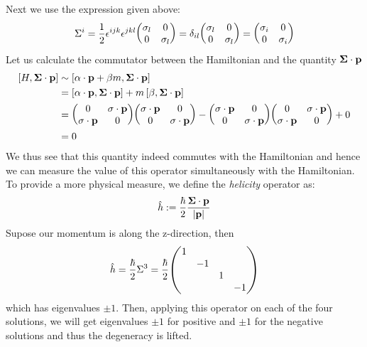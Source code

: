 Next we use the expression given above:
\begin{align*}
    \Sigma^i = \frac{1}{2}\epsilon^{ijk} \epsilon^{jkl}\mqty(\sigma_l & 0\\0 & \sigma_l) = \delta_{il}\mqty(\sigma_l & 0\\0 & \sigma_l) = \mqty(\sigma_i & 0\\0 & \sigma_i)
\end{align*}
Let us calculate the commutator between the Hamiltonian and the quantity $\vb{\Sigma}\cdot \vb{p}$
\begin{align*}
    \comtr{H}{\vb{\Sigma}\cdot \vb{p}} &\sim \comtr{\alpha\cdot\vb{p} + \beta m}{\vb{\Sigma}\cdot \vb{p}}\\
    &=\comtr{\alpha\cdot\vb{p}}{\vb{\Sigma}\cdot \vb{p}} + m\comtr{\beta }{\vb{\Sigma}\cdot \vb{p}}\\
    &=\mqty(0&\vb{\sigma}\cdot \vb{p}\\ \vb{\sigma}\cdot \vb{p}& 0)\mqty(\vb{\sigma}\cdot\vb{p}& 0\\ 0&\vb{\sigma}\cdot\vb{p}) -\mqty(\vb{\sigma}\cdot\vb{p}& 0\\ 0&\vb{\sigma}\cdot\vb{p})\mqty(0&\vb{\sigma}\cdot \vb{p}\\ \vb{\sigma}\cdot \vb{p}& 0) + 0\\
    &=0
\end{align*}
We thus see that this quantity indeed commutes with the Hamiltonian and hence we can measure the value of this operator simultaneously with the Hamiltonian. To provide a more physical measure, we define the \textit{helicity } operator as:
\begin{equation}\label{eqn:helicity}
    \hat{h} :=\frac{\hbar}{2} \frac{\vb{\Sigma}\cdot \vb{p}}{|\vb{p}|}
\end{equation}
Supose our momentum is along the z-direction, then $$\hat{h} = \frac{\hbar}{2}\Sigma^3 = \frac{\hbar}{2}\mqty(1& & & \\ &-1 & & \\ & & 1 & \\ & & & -1)$$
which has eigenvalues $\pm 1$. Then, applying this operator on each of the four solutions, we will get eigenvalues $\pm 1$ for positive and $\pm 1$ for the negative solutions and thus the degeneracy is lifted. 
